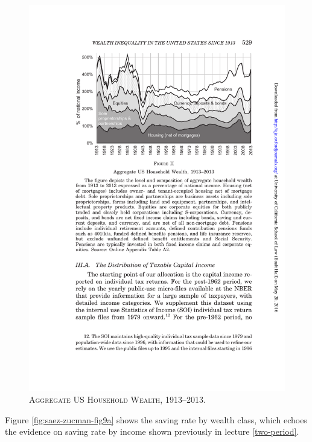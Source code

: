 \documentclass[]{book}
\theoremstyle{definition}
\theoremstyle{definition}
\theoremstyle{definition}
\theoremstyle{remark}
\begin{document}
\begin{figure}

{\centering \includegraphics[width=1\linewidth,height=1\textheight]{figures/fig2-nolegend2} 

}

\caption{\textsc{Aggregate US Household Wealth,
1913--2013}.}\label{fig:saez-zucman-fig2}
\end{figure}

Figure \ref{fig:saez-zucman-fig9a} shows the saving rate by wealth
class, which echoes the evidence on saving rate by income shown
previously in lecture \ref{two-period}.
\end{document}

